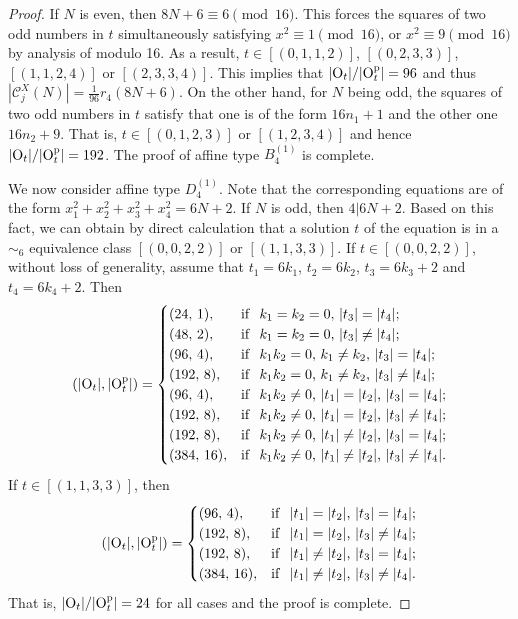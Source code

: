 \documentclass[11pt]{amsart}
\theoremstyle{plain}
\numberwithin{equation}{subsection}
\begin{document}
\begin{proof}
If $N$ is even, then $8N+6\equiv 6 \pmod {16}$. This forces the squares of two odd numbers in $t$ simultaneously satisfying 
$x^2\equiv 1 \pmod{16}$, or $x^2\equiv 9 \pmod{16}$ by analysis of modulo 16. 
As a result, $t\in [(0, 1, 1, 2)]$, $[(0, 2, 3, 3)]$, $[(1, 1, 2, 4)]$ or $[(2, 3, 3, 4)]$.
This implies that $|{\rm O}_t|/ |{\rm O}_t^{\rm p}|=96$ and thus $|\mathcal{C}_j^X(N)|=\frac{1}{96}r_4(8N+6)$.
On the other hand, for $N$ being odd, the squares of two odd numbers in $t$ 
satisfy that one is of the form $16n_1+1$ and the other one $16n_2+9$.
That is, $t\in [(0, 1, 2, 3)]$ or $[(1, 2, 3, 4)]$ and hence $|{\rm O}_t|/ |{\rm O}_t^{\rm p}|=192$. 
The proof of affine type $B_4^{(1)}$ is complete.

We now consider affine type $D_4^{(1)}$. Note that the corresponding equations are of the form $x_1^2+x_2^2+x_3^2+x_4^2=6N+2$. 
If $N$ is odd, then $4|6N+2$. Based on this fact, we can obtain by direct calculation 
that a solution $t$ of the equation is in a $\sim_6$ equivalence class $[(0, 0, 2, 2)]$ or $[(1, 1, 3, 3)]$.
If $t\in [(0, 0, 2, 2)]$, without loss of generality, assume that $t_1=6k_1$, $t_2=6k_2$, $t_3=6k_3+2$ and $t_4=6k_4+2$. Then
$$(|{\rm O}_t|, |{\rm O}_t^{\rm p}|)=
\begin{cases}
	(24,\,1),  &  {\rm if }\,\, \text{ $k_1=k_2=0$, $|t_3|=|t_4|$}; \\
	(48,\,2),  & {\rm if }\,\, \text{ $k_1=k_2=0$, $|t_3|\neq|t_4|$};\\
	(96,\,4),  & {\rm if }\,\, \text{ $k_1k_2=0$, $k_1\neq k_2$, $|t_3|=|t_4|$};\\
    (192,\,8),  & {\rm if }\,\, \text{ $k_1k_2=0$, $k_1\neq k_2$, $|t_3|\neq|t_4|$};\\
	(96,\,4),  & {\rm if }\,\, \text{ $k_1k_2\neq0$, $|t_1|=|t_2|$, $|t_3|=|t_4|$}; \\
	(192,\,8),  & {\rm if }\,\, \text{ $k_1k_2\neq0$, $|t_1|=|t_2|$, $|t_3|\neq|t_4|$};\\
	(192,\,8),  & {\rm if }\,\, \text{ $k_1k_2\neq0$, $|t_1|\neq|t_2|$, $|t_3|=|t_4|$};\\
	(384,\,16),  & {\rm if }\,\, \text{ $k_1k_2\neq0$, $|t_1|\neq|t_2|$, $|t_3|\neq|t_4|$.}
\end{cases}
$$
If $t\in [(1, 1, 3, 3)]$, then
$$(|{\rm O}_t|, |{\rm O}_t^{\rm p}|)=
\begin{cases}
	(96,\,4),  & {\rm if }\,\, \text{ $|t_1|=|t_2|$, $|t_3|=|t_4|$}; \\
	(192,\,8),  & {\rm if }\,\, \text{ $|t_1|=|t_2|$, $|t_3|\neq|t_4|$};\\
	(192,\,8),  & {\rm if }\,\, \text{ $|t_1|\neq|t_2|$, $|t_3|=|t_4|$};\\
	(384,\,16),  & {\rm if }\,\, \text{ $|t_1|\neq|t_2|$, $|t_3|\neq|t_4|$.}
\end{cases}
$$
That is, $|{\rm O}_t|/|{\rm O}_t^{\rm p}|=24$ for all cases and the proof is complete.
\end{proof}
\end{document}
